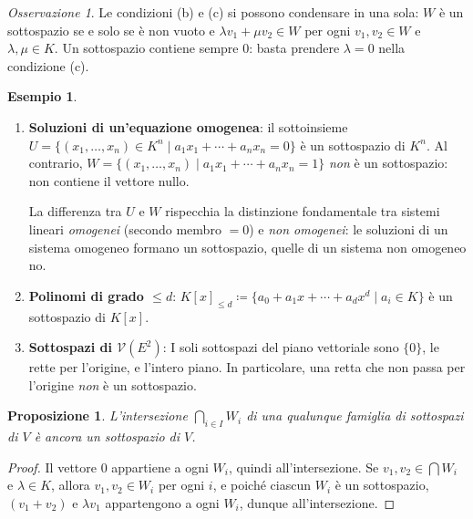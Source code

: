\documentclass[11pt, a4paper]{book}
\theoremstyle{definition}
\newtheorem{esempio}[definizione]{Esempio}
\theoremstyle{plain}
\newtheorem{proposizione}[definizione]{Proposizione}
\theoremstyle{remark}
\newtheorem{osservazione}[definizione]{Osservazione}
\begin{document}
\begin{osservazione}
Le condizioni (b) e (c) si possono condensare in una sola: $W$ è un sottospazio se e solo se è non vuoto e $\lambda v_1 + \mu v_2 \in W$ per ogni $v_1, v_2 \in W$ e $\lambda, \mu \in K$. Un sottospazio contiene sempre $0$: basta prendere $\lambda = 0$ nella condizione (c).
\end{osservazione}

\begin{exbox}
\begin{esempio}
\label{ex:sottospazi}
\begin{enumerate}
  \item \textbf{Soluzioni di un'equazione omogenea}: il sottoinsieme $U = \{(x_1,\ldots,x_n) \in K^n \mid a_1 x_1 + \cdots + a_n x_n = 0\}$ è un sottospazio di $K^n$. Al contrario, $W = \{(x_1,\ldots,x_n) \mid a_1 x_1 + \cdots + a_n x_n = 1\}$ \emph{non} è un sottospazio: non contiene il vettore nullo.

  La differenza tra $U$ e $W$ rispecchia la distinzione fondamentale tra sistemi lineari \emph{omogenei} (secondo membro $= 0$) e \emph{non omogenei}: le soluzioni di un sistema omogeneo formano un sottospazio, quelle di un sistema non omogeneo no.

  \item \textbf{Polinomi di grado $\leq d$}: $K[x]_{\leq d} \coloneqq \{a_0 + a_1 x + \cdots + a_d x^d \mid a_i \in K\}$ è un sottospazio di $K[x]$.

  \item \textbf{Sottospazi di $\mathcal{V}(E^2)$}: I soli sottospazi del piano vettoriale sono $\{0\}$, le rette per l'origine, e l'intero piano. In particolare, una retta che non passa per l'origine \emph{non} è un sottospazio.
\end{enumerate}
\end{esempio}
\end{exbox}

\begin{proposizione}
\label{prop:intersez}
L'intersezione $\bigcap_{i \in I} W_i$ di una qualunque famiglia di sottospazi di $V$ è ancora un sottospazio di $V$.
\end{proposizione}

\begin{proof}
Il vettore $0$ appartiene a ogni $W_i$, quindi all'intersezione. Se $v_1, v_2 \in \bigcap W_i$ e $\lambda \in K$, allora $v_1, v_2 \in W_i$ per ogni $i$, e poiché ciascun $W_i$ è un sottospazio, $(v_1+v_2)$ e $\lambda v_1$ appartengono a ogni $W_i$, dunque all'intersezione.
\end{proof}
\end{document}
